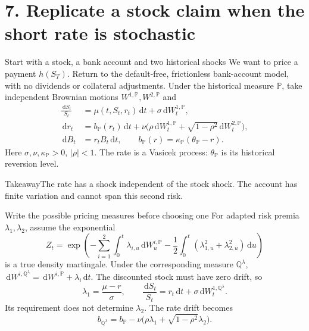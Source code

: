 \documentclass[handout,10pt,t,aspectratio=169]{beamer}
\newenvironment{keybox}{\begin{exampleblock}{Takeaway}}{\end{exampleblock}}
\newcommand{\Q}{\mathbb Q}
\newcommand{\Pp}{\mathbb P}
\newcommand{\dd}{\,\mathrm d}
\begin{document}
\section{7. Replicate a stock claim when the short rate is stochastic}

\begin{frame}{Start with a stock, a bank account and two historical shocks}
\small
We want to price a payment \(h(S_T)\). Return to the default-free,
frictionless bank-account model, with no dividends or collateral adjustments.
Under the historical measure \(\Pp\), take independent Brownian motions
\(W^{1,\Pp},W^{2,\Pp}\) and
\[
 \begin{aligned}
 \frac{\dd S_t}{S_t}&=\mu(t,S_t,r_t)\dd t+\sigma\dd W_t^{1,\Pp},\\
 \dd r_t&=b_\Pp(r_t)\dd t+
 \nu\bigl(\rho\dd W_t^{1,\Pp}+\sqrt{1-\rho^2}\dd W_t^{2,\Pp}\bigr),\\
 \dd B_t&=r_tB_t\dd t,\qquad b_\Pp(r)=\kappa_\Pp(\theta_\Pp-r).
 \end{aligned}
\]
Here \(\sigma,\nu,\kappa_\Pp>0\), \(|\rho|<1\).
The rate is a Vasicek process: \(\theta_\Pp\) is its historical reversion level.
\begin{keybox}The rate has a shock independent of the stock shock.
The account has finite variation and cannot span this second risk.
\end{keybox}
\end{frame}

\begin{frame}{Write the possible pricing measures before choosing one}
\small
For adapted risk premia \(\lambda_1,\lambda_2\), assume the exponential
\[
 Z_t=\exp\!\left(-\sum_{i=1}^2\int_0^t\lambda_{i,u}\dd W_u^{i,\Pp}
 -\frac12\int_0^t(\lambda_{1,u}^2+\lambda_{2,u}^2)\dd u\right)
\]
is a true density martingale. Under the corresponding measure \(\Q^\lambda\),
\(\dd W^{i,\Q^\lambda}=\dd W^{i,\Pp}+\lambda_i\dd t\).
The discounted stock must have zero drift, so
\[
 \lambda_1=\frac{\mu-r}{\sigma},\qquad
 \frac{\dd S_t}{S_t}=r_t\dd t+\sigma\dd W_t^{1,\Q^\lambda}.
\]
Its requirement does not determine \(\lambda_2\). The rate drift becomes
\[
 \boxed{b_{\Q^\lambda}=b_\Pp-
 \nu\bigl(\rho\lambda_1+\sqrt{1-\rho^2}\lambda_2\bigr).}
\]
\end{frame}
\end{document}
